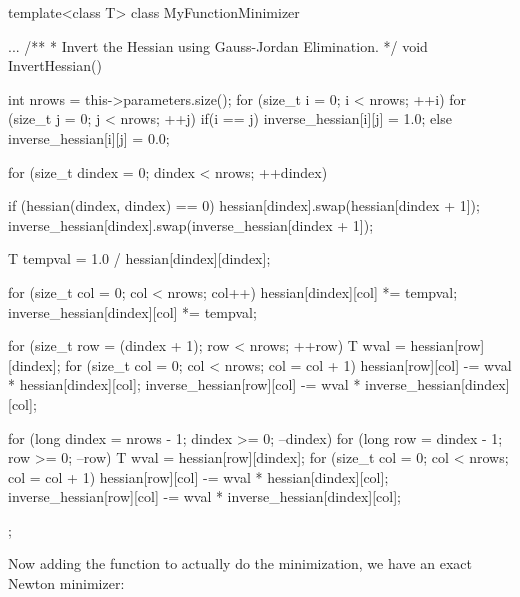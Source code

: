 \documentclass[12pt,a4paper]{article}
\begin{document}
\begin{cppsource}

    template<class T>
    class MyFunctionMinimizer {
        ...
        /**
         * Invert the Hessian using Gauss-Jordan Elimination.
         */
        void InvertHessian() {
            int nrows = this->parameters.size();
            for (size_t i = 0; i < nrows; ++i) {
                for (size_t j = 0; j < nrows; ++j) {
                    if(i == j){
                        inverse_hessian[i][j] = 1.0;
                    }else{
                        inverse_hessian[i][j] = 0.0;
                    }
                }
            }


            for (size_t dindex = 0; dindex < nrows; ++dindex) {

                if (hessian(dindex, dindex) == 0) {
                    hessian[dindex].swap(hessian[dindex + 1]);
                    inverse_hessian[dindex].swap(inverse_hessian[dindex + 1]);
                }


                T tempval = 1.0 / hessian[dindex][dindex];

                for (size_t col = 0; col < nrows; col++) {
                    hessian[dindex][col] *= tempval;
                    inverse_hessian[dindex][col] *= tempval;
                }

                for (size_t row = (dindex + 1); row < nrows; ++row) {
                    T wval = hessian[row][dindex];
                    for (size_t col = 0; col < nrows; col = col + 1) {
                        hessian[row][col] -= wval * hessian[dindex][col];
                        inverse_hessian[row][col] -= wval * inverse_hessian[dindex][col];
                    }
                }
            }

            for (long dindex = nrows - 1; dindex >= 0; --dindex) {
                for (long row = dindex - 1; row >= 0; --row) {
                    T wval = hessian[row][dindex];
                    for (size_t col = 0; col < nrows; col = col + 1) {
                        hessian[row][col] -= wval * hessian[dindex][col];
                        inverse_hessian[row][col] -= wval * inverse_hessian[dindex][col];
                    }
                }
            }

        }


    };
\end{cppsource}
Now adding the function to actually do the minimization, we have an exact Newton minimizer:   
\end{document}
